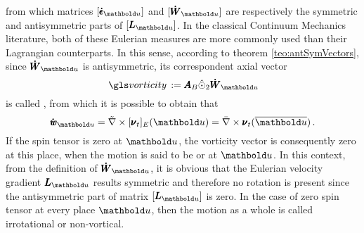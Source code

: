 from which matrices $[\tnr{\dot{\epsilon}}_{{\vto{u}}}]$ and $[\tnr{\dot{W}}_{{\vto{u}}}]$ are respectively the symmetric and antisymmetric parts of $[\tnr{L}_{{\vto{u}}}]$. In the classical Continuum Mechanics literature, both of these Eulerian measures are more commonly used than their Lagrangian counterparts. In this sense, according to theorem \ref{teo:antSymVectors}, since $\tnr{\dot{W}}_{{\vto{u}}}$ is antisymmetric, its correspondent axial vector 
\begin{equation}\label{eq:vectSpin}
\gloref{vorticity}:=\tnr{A}_B\hat{\odot}_2 \tnr{\dot{W}}_{{\vto{u}}}
\end{equation}
is called , from which it is possible to obtain that
\begin{equation}\label{eq:curlVelocities}
\tnr{\dot{\mathit{w}}}_{{\vto{u}}}=\tilde{\nabla}\times[\tnr{\nu}_t]_E({\vto{u}})=\bar{\nabla}\times\tnr{\nu}_t(\overline{\vto{u}})\,.
\end{equation}
If the spin tensor is zero at $\vto{u}$, the vorticity vector is consequently zero at this place, when the motion is said to be  or  at $\vto{u}$. In this context, from the definition of $\tnr{\dot{W}}_{{\vto{u}}}$, it is obvious that the Eulerian velocity gradient $\tnr{L}_{{\vto{u}}}$ results symmetric and therefore no rotation is present since the antisymmetric part of matrix $[\tnr{L}_{{\vto{u}}}]$ is zero. In the case of zero spin tensor at every place $\vto{u}$, then the motion as a whole is called irrotational or non-vortical. 

